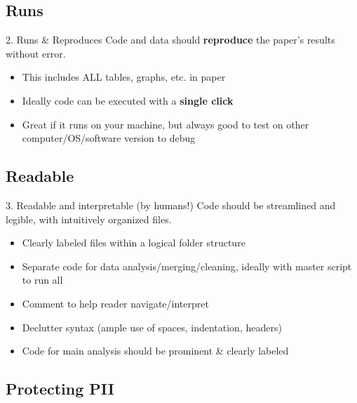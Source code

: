 \documentclass[12pt, compress]{beamer} %
\let\olditem\item %
\renewcommand{\item}{%
\olditem\vspace{\fill}}
\begin{document}
\subsection{Runs}
	\begin{frame}{2. Runs \& Reproduces}
		Code and data should \textbf{reproduce} the paper's results without error. 
		
		\begin{itemize}
			\item This includes ALL tables, graphs, etc. in paper
			\item Ideally code can be executed with a \textbf{single click}
			\item Great if it runs on your machine, but always good to test on other computer/OS/software version to debug
		\end{itemize}
		
			
	\end{frame}

\subsection{Readable}

	\begin{frame}{3. Readable and interpretable (by humans!)}
		Code should be streamlined and legible, with intuitively organized files. 
		
		\begin{itemize}		
			\item Clearly labeled files within a logical folder structure
			\item Separate code for data analysis/merging/cleaning, ideally with master script to run all
			\item Comment to help reader navigate/interpret
			\item Declutter syntax (ample use of spaces, indentation, headers)
			\item Code for main analysis should be prominent \& clearly labeled
		\end{itemize} 
			
	\end{frame}

\subsection{Protecting PII}
 
\end{document}
